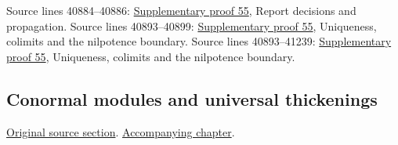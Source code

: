 \begin{AlgebraSourceRoutes}
 Source lines 40884--40886: \hyperlink{algebra_conormal_thickening_notes_20260928}{Supplementary proof 55}, Report decisions and propagation.
 Source lines 40893--40899: \hyperlink{algebra_conormal_thickening_notes_20260928}{Supplementary proof 55}, Uniqueness, colimits and the nilpotence boundary.
 Source lines 40893--41239: \hyperlink{algebra_conormal_thickening_notes_20260928}{Supplementary proof 55}, Uniqueness, colimits and the nilpotence boundary.
\end{AlgebraSourceRoutes}

\subsection{Conormal modules and universal thickenings}
\hypertarget{algebra-source-section-conormal}{}
\noindent\href{https://github.com/stacks/stacks-project/blob/a04446e57ec1fbc252a871afcec7752fb2807b14/algebra.tex\#L40911}{Original source section}. \href{algebra.pdf\#nameddest=section-conormal}{Accompanying chapter}.

